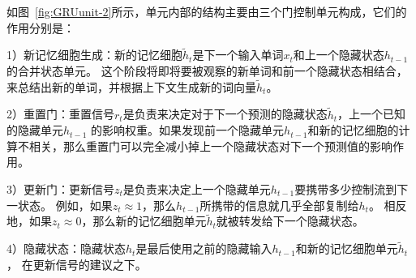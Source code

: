 如图~\ref{fig:GRUunit-2}所示，单元内部的结构主要由三个门控制单元构成，它们的作用分别是：

1）新记忆细胞生成：新的记忆细胞${\widetilde{h}_{t}}$是下一个输入单词${x_{t}}$和上一个隐藏状态${h_{t-1}}$的合并状态单元。
	这个阶段将即将要被观察的新单词和前一个隐藏状态相结合，来总结出新的单词，并根据上下文生成新的词向量${\widetilde{h}_{t}}$。

2）重置门：重置信号${r_{t}}$是负责来决定对于下一个预测的隐藏状态${\widetilde{h}_{t}}$，上一个已知的隐藏单元${h_{t-1}}$
	的影响权重。如果发现前一个隐藏单元${h_{t-1}}$和新的记忆细胞的计算不相关，那么重置门可以完全减小掉上一个隐藏状态对下一个预测值的影响作用。

3）更新门：更新信号${z_{t}}$是负责来决定上一个隐藏单元${h_{t-1}}$要携带多少控制流到下一状态。
	例如，如果${z_{t}\approx1}$，那么${h_{t-1}}$所携带的信息就几乎全部复制给${h_{t}}$。
	相反地，如果${z_{t}\approx0}$，那么新的记忆细胞单元${\widetilde{h}_{t}}$就被转发给下一个隐藏状态。

4）隐藏状态：隐藏状态${h_{t}}$是最后使用之前的隐藏输入${h_{t-1}}$和新的记忆细胞单元${\widetilde{h}_{t}}$，
	在更新信号的建议之下。

